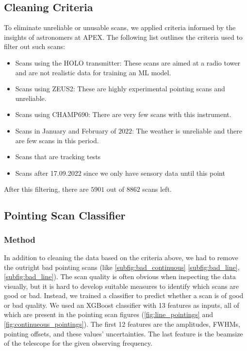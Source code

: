 \subsection{Cleaning Criteria}
To eliminate unreliable or unusable scans, we applied criteria informed by the insights of astronomers at APEX.
The following list outlines the criteria used to filter out such scans:
\begin{itemize}
    \item Scans using the HOLO transmitter:
    These scans are aimed at a radio tower and are not realistic data for training an ML model.
    \item Scans using ZEUS2:
    These are highly experimental pointing scans and unreliable.
    \item Scans using CHAMP690: There are very few scans with this instrument.
    \item Scans in January and February of $2022$: The weather is unreliable and there are few scans in this period.
    \item Scans that are tracking tests
    \item Scans after 17.09.2022 since we only have sensory data until this point
\end{itemize}   
After this filtering, there are $5901$ out of $8862$ scans left.
        
\subsection{Pointing Scan Classifier} 
\subsubsection{Method}
In addition to cleaning the data based on the criteria above, we had to remove the outright bad pointing scans (like \ref{subfig:bad_continuous} \ref{subfig:bad_line}, \ref{subfig:bad_line}).
The scan quality is often obvious when inspecting the data visually, but it is hard to develop suitable measures to identify which scans are good or bad.
Instead, we trained a classifier to predict whether a scan is of good or bad quality.
We used an XGBoost classifier with 13 features as inputs, all of which are present in the pointing scan figures (\ref{fig:line_pointings} and \ref{fig:continueous_pointings}).
The first 12 features are the amplitudes, FWHMs, pointing offsets, and these values' uncertainties.
The last feature is the beamsize of the telescope for the given observing frequency.\\

